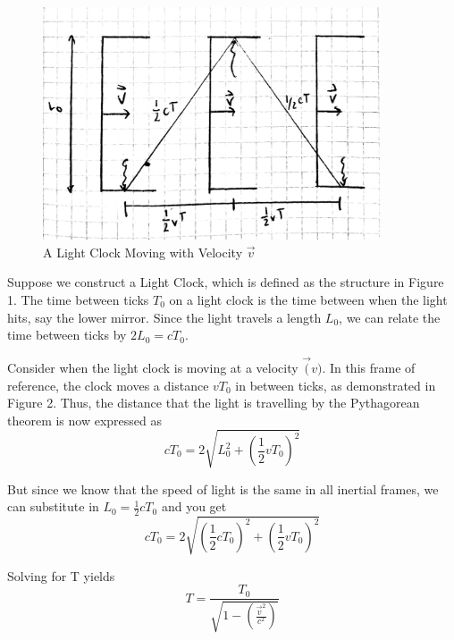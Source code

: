 \documentclass{article}
\begin{document}
\begin{figure}[!htb]
  \centering
  \includegraphics[width=100mm]{lightclockmoving}\par
  \caption{A Light Clock Moving with Velocity \(\vec{v}\)}
\end{figure}

\newpage
Suppose we construct a Light Clock, which is defined as the structure in Figure 1. The time between ticks \(T_0\) on a light clock is the time between when the light hits, say the lower mirror. Since the light travels a length \(L_0\), we can relate the time between ticks by \(2L_0 = cT_0\).

Consider when the light clock is moving at a velocity \(\vec(v)\). In this frame of reference, the clock moves a distance \(vT_0\) in between ticks, as demonstrated in Figure 2. Thus, the distance that the light is travelling by the Pythagorean theorem is now expressed as
\[
cT_0 = 2\sqrt{L_0^2 + (\frac{1}{2}vT_0)^2}
\]

But since we know that the speed of light is the same in all inertial frames, we can substitute in \(L_0 = \frac{1}{2}cT_0\) and you get
\[
cT_0 = 2\sqrt{(\frac{1}{2}cT_0)^2 + (\frac{1}{2}vT_0)^2}
\]

Solving for T yields
\[
  T = \frac{T_0}{\sqrt{1 - (\frac{\vec{v}^2}{c^2})}}
\]
\end{document}

